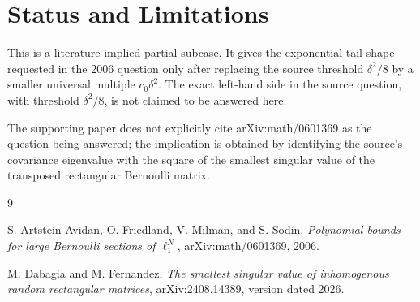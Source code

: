 \documentclass[11pt]{article}
\begin{document}
\section*{Status and Limitations}

This is a literature-implied partial subcase.  It gives the exponential tail
shape requested in the 2006 question only after replacing the source threshold
\(\delta^2/8\) by a smaller universal multiple \(c_0\delta^2\).  The exact
left-hand side in the source question, with threshold \(\delta^2/8\), is not
claimed to be answered here.

The supporting paper does not explicitly cite arXiv:math/0601369 as the
question being answered; the implication is obtained by identifying the
source's covariance eigenvalue with the square of the smallest singular value
of the transposed rectangular Bernoulli matrix.

\begin{thebibliography}{9}

S. Artstein-Avidan, O. Friedland, V. Milman, and S. Sodin,
\emph{Polynomial bounds for large Bernoulli sections of \(\ell_1^N\)},
arXiv:math/0601369, 2006.

M. Dabagia and M. Fernandez,
\emph{The smallest singular value of inhomogenous random rectangular matrices},
arXiv:2408.14389, version dated 2026.

\end{thebibliography}
\end{document}
